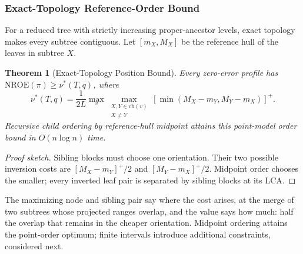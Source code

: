 \documentclass[review]{vgtc}
\newtheorem{theorem}{Theorem}
\newcommand{\nroe}{\mathrm{NROE}}
\begin{document}
\subsubsection{Exact-Topology Reference-Order Bound}
For a reduced tree with strictly increasing proper-ancestor levels, exact topology makes every subtree contiguous. Let $[m_X,M_X]$ be the reference hull of the leaves in subtree $X$.
\begin{theorem}[Exact-Topology Position Bound]\label{thm:order}
Every zero-error profile has $\nroe(\pi)\ge\nu^*(T,q)$, where
\begin{equation}\label{eq:nu}
 \nu^*(T,q)=\frac{1}{2L}\max_v\max_{\substack{X,Y\in\mathrm{ch}(v)\\X\ne Y}}
 [\min(M_X-m_Y,M_Y-m_X)]^+.
\end{equation}
Recursive child ordering by reference-hull midpoint attains this point-model order bound in $O(n\log n)$ time.
\end{theorem}
\begin{proof}[Proof sketch]
Sibling blocks must choose one orientation. Their two possible inversion costs are $[M_X-m_Y]^+/2$ and $[M_Y-m_X]^+/2$. Midpoint order chooses the smaller; every inverted leaf pair is separated by sibling blocks at its LCA.
\end{proof}
The maximizing node and sibling pair say where the cost arises, at the merge of two subtrees whose projected ranges overlap, and the value says how much: half the overlap that remains in the cheaper orientation. Midpoint ordering attains the point-order optimum; finite intervals introduce additional constraints, considered next.
\end{document}
